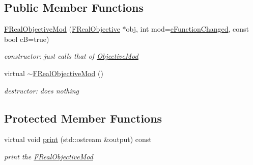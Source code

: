 \subsection*{Public Member Functions}
\begin{DoxyCompactItemize}
\item 
\mbox{\label{class_s_m_spp__di__unipi__it_1_1_f_real_objective_mod_a7e5531d69842de0cf59bbd8bdff5f0ea}} 
\mbox{\hyperlink{class_s_m_spp__di__unipi__it_1_1_f_real_objective_mod_a7e5531d69842de0cf59bbd8bdff5f0ea}{F\+Real\+Objective\+Mod}} (\mbox{\hyperlink{class_s_m_spp__di__unipi__it_1_1_f_real_objective}{F\+Real\+Objective}} $\ast$obj, int mod=\mbox{\hyperlink{class_s_m_spp__di__unipi__it_1_1_f_real_objective_mod_a10f9cfdc831c025f33e97e51a22e32a3a2d56f392a43ca0db9b27247c7d60b944}{e\+Function\+Changed}}, const bool cB=true)
\begin{DoxyCompactList}\small\item\em constructor\+: just calls that of \mbox{\hyperlink{class_s_m_spp__di__unipi__it_1_1_objective_mod}{Objective\+Mod}} \end{DoxyCompactList}\item 
\mbox{\label{class_s_m_spp__di__unipi__it_1_1_f_real_objective_mod_a05b5c4494d66f048b8d7d00adfab6970}} 
virtual \mbox{\hyperlink{class_s_m_spp__di__unipi__it_1_1_f_real_objective_mod_a05b5c4494d66f048b8d7d00adfab6970}{$\sim$\+F\+Real\+Objective\+Mod}} ()
\begin{DoxyCompactList}\small\item\em destructor\+: does nothing \end{DoxyCompactList}\end{DoxyCompactItemize}
\subsection*{Protected Member Functions}
\begin{DoxyCompactItemize}
\item 
\mbox{\label{class_s_m_spp__di__unipi__it_1_1_f_real_objective_mod_a2e7b9c9148a98c5c342e8c25cac95926}} 
virtual void \mbox{\hyperlink{class_s_m_spp__di__unipi__it_1_1_f_real_objective_mod_a2e7b9c9148a98c5c342e8c25cac95926}{print}} (std\+::ostream \&output) const
\begin{DoxyCompactList}\small\item\em print the \mbox{\hyperlink{class_s_m_spp__di__unipi__it_1_1_f_real_objective_mod}{F\+Real\+Objective\+Mod}} \end{DoxyCompactList}\end{DoxyCompactItemize}
